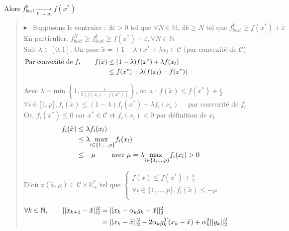 \documentclass[12pt,a4paper]{article}
\newcommand{\preuve}[1]{%
    \begin{quote}
        $\blacktriangleright$~#1
    \end{quote}
}
\begin{document}
Alors $f^k_{best} \xrightarrow[k \rightarrow \infty]{} f(x^*)$\\

\preuve{
    Supposons le contraire : $\exists \varepsilon > 0$ tel que $\forall N \in \mathbb{N}$, $\exists k \geq N$ tel que $f^k_{best} \geq f(x^*) + \varepsilon$\\
En particulier, $f^N_{best} \geq f^k_{best} \geq f(x^*) + \varepsilon, \forall N \in \mathbb{N}$\\

Soit $\lambda \in [0, 1]$. On pose $\tilde{x} = (1 - \lambda) x^* + \lambda x_l \in \mathcal{C}$ (par convexité de $\mathcal{C}$)
\begin{align*}
    \text{Par convexité de } f, \qquad f(\tilde{x}) &\leq (1 - \lambda) f(x^*) + \lambda f(x_l) \hspace{14.5cm}\\
    &\leq f(x^*) + \lambda (f(x_l) - f(x^*))
\end{align*}

Avec $\lambda = \text{min } \left\{1, \frac{\varepsilon}{2(f(x_l) - f(x^*))} \right\}$, on a :
$f(\tilde{x}) \leq f(x^*) + \frac{\varepsilon}{2}$\\

$\forall i \in \llbracket 1, p \rrbracket , f_i(\tilde{x}) \leq (1 - \lambda) f_i(x^*) + \lambda f_i(x_e) \quad \text{ par convexité de } f_i$\\
Or, $f_i(x^*) \leq 0$ car $x^* \in \mathcal{C}$ et $f_i(x_l) < 0$ par définition de $x_l$\\

\begin{align*}
    f_i(\tilde{x}) &\leq \lambda f_i(x_l) \hspace{14.5cm}\\
    &\leq \lambda \underset{i \in \{1, \dots, p\}}{\text{max }} f_i(x_l)\\
    &\leq - \mu \qquad \text{ avec } \mu = \lambda \underset{i \in \{1, \dots, p\}}{\text{max }} f_i(x_l) > 0
\end{align*}

D'où $\exists (\tilde{x}, \mu) \in \mathcal{C} \times \mathbb{R}_+^*$ tel que
$
\begin{cases}
    f(\tilde{x}) \leq f(x^*) + \frac{\varepsilon}{2}\\
    \forall i \in \{1, \dots, p\}, f_i(\tilde{x}) \leq - \mu\\
\end{cases}
$

\begin{align*}
    \forall k \in \mathbb{N}, \qquad ||x_{k+1} - \tilde{x}||_2^2 &= ||x_k - \alpha_k g_k - \tilde{x}||_2^2 \hspace{14.5cm}\\
    &= ||x_k - \tilde{x}||_2^2 - 2 \alpha_k g_k^T (x_k - \tilde{x}) + \alpha_k^2 ||g_k||_2^2
\end{align*}

}
\end{document}
